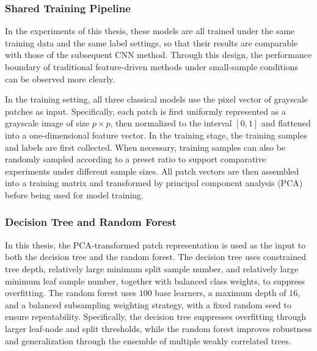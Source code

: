 \subsubsection{Shared Training Pipeline}
\par In the experiments of this thesis, these models are all trained under the
same training data and the same label settings, so that their results are
comparable with those of the subsequent CNN method. Through this design, the
performance boundary of traditional feature-driven methods under small-sample
conditions can be observed more clearly.

\par In the training setting, all three classical models use the pixel vector of
grayscale patches as input. Specifically, each patch is first uniformly
represented as a grayscale image of size $p\times p$, then normalized to the
interval $[0,1]$ and flattened into a one-dimensional feature vector. In the
training stage, the training samples and labels are first collected. When
necessary, training samples can also be randomly sampled according to a preset
ratio to support comparative experiments under different sample sizes. All patch
vectors are then assembled into a training matrix and transformed by principal
component analysis (PCA) before being used for model training.

\subsubsection{Decision Tree and Random Forest}
\par In this thesis, the PCA-transformed patch representation is used as the
input to both the decision tree and the random forest. The decision tree uses
constrained tree depth, relatively large minimum split sample number, and
relatively large minimum leaf sample number, together with balanced class
weights, to suppress overfitting. The random forest uses $100$ base learners, a
maximum depth of $16$, and a balanced subsampling weighting strategy, with a
fixed random seed to ensure repeatability. Specifically, the decision tree
suppresses overfitting through larger leaf-node and split thresholds, while the
random forest improves robustness and generalization through the ensemble of
multiple weakly correlated trees.

